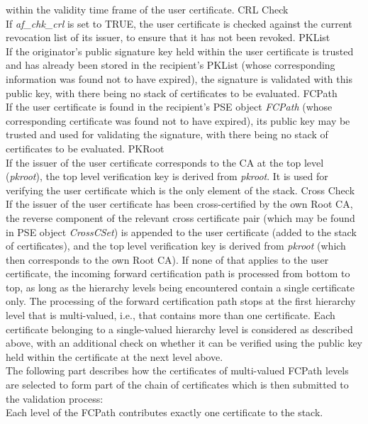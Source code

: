within the validity time frame of the user certificate.
\m CRL Check \\
If {\em af\_chk\_crl} is set to TRUE, the user certificate is checked against the current 
revocation list of its issuer, to ensure that it has not been revoked.
\m PKList \\
If the originator's public signature key held within the user certificate
is trusted and has already been stored in the recipient's PKList (whose
corresponding information was found not to have expired),
the signature is validated with this public key, with there being no stack of 
certificates to be evaluated.
\m FCPath \\
If the user certificate is found in the recipient's PSE object {\em FCPath} (whose
corresponding certificate was found not to have expired), its public
key may be trusted and used for validating the signature, with there being no stack of 
certificates to be evaluated.
\m PKRoot \\
If the issuer of the user certificate corresponds to the CA at the top level
({\em pkroot}), the top level verification key is derived from {\em pkroot}. It is 
used for verifying the user certificate which is the only element of the stack.
\m Cross Check \\
If the issuer of the user certificate has been cross-certified by the own Root CA, the 
reverse component of the relevant cross certificate pair (which may be found in PSE
object {\em CrossCSet}) is appended to the user certificate (added to the stack of certificates), 
and the top level verification key is derived from {\em pkroot} (which then corresponds
to the own Root CA).
\ee
If none of that applies to the user certificate, the incoming forward certification path
is processed from bottom to top, as long as the hierarchy levels being encountered contain
a single certificate only. The processing of the forward certification path stops
at the first hierarchy level that is multi-valued, i.e., that contains more than one
certificate.
Each certificate belonging to a single-valued hierarchy level is considered as described
above, with an additional check on whether it can be verified using the public key held 
within the certificate at the next level above.
\\ [1em]
The following part describes how the certificates of multi-valued FCPath levels are selected
to form part of the chain of certificates which is then submitted to the validation process:
\\ [1em]
Each level of the FCPath contributes exactly one certificate to the stack.

